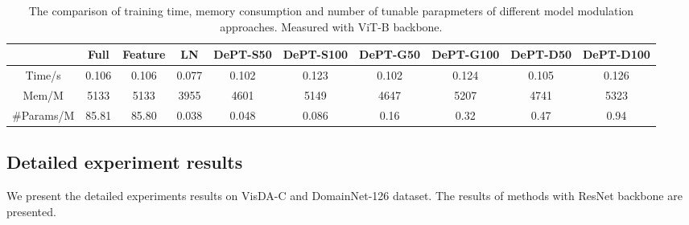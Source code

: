 \documentclass{article} \usepackage{iclr2023_conference,times}
\begin{document}
\begin{table}[h]
    \centering
    \scriptsize
    \caption{The comparison of training time, memory consumption and number of tunable parapmeters of different model modulation approaches. Measured with ViT-B backbone.}
    \begin{tabular}{c|c|c|c|c|c|c|c|c|c}
         &  \bf Full & \bf Feature &\bf LN & \bf DePT-S50 & \bf DePT-S100 & \bf DePT-G50 &\bf DePT-G100 &\bf DePT-D50 & \bf DePT-D100\\ \toprule
    Time/s   &  0.106 & 0.106 & 0.077 & 0.102 & 0.123 & 0.102 & 0.124 & 0.105 & 0.126 \\ \hline
    Mem/M    & 5133 & 5133 & 3955 & 4601 & 5149 & 4647 & 5207 & 4741 & 5323 \\\hline
    \#Params/M & 85.81 & 85.80& 0.038 & 0.048 & 0.086 & 0.16 & 0.32 & 0.47 & 0.94 \\ \bottomrule
    \end{tabular}
    \label{appendix-tab:computation_analysis}
\end{table}

\subsection{Detailed experiment results}
We present the detailed experiments results on VisDA-C and DomainNet-126 dataset. The results of methods with ResNet backbone are presented.
\end{document}
